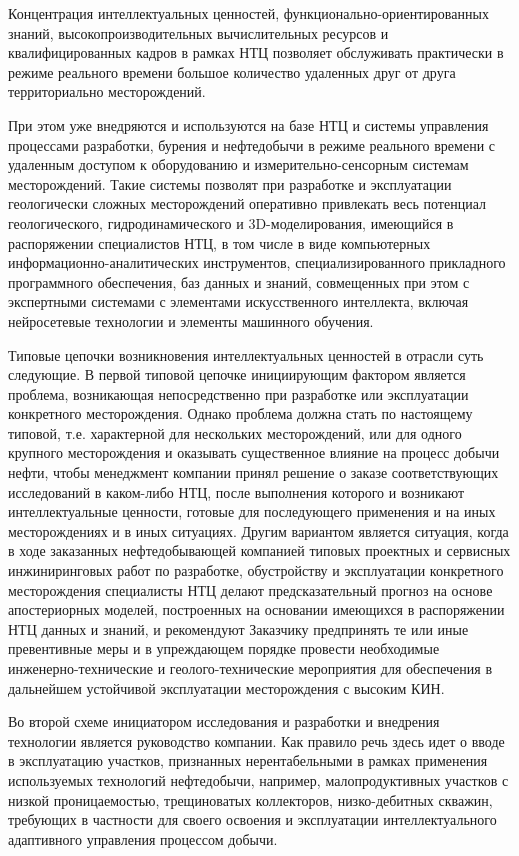 Концентрация интеллектуальных ценностей, функционально-ориентированных знаний, высокопроизводительных вычислительных ресурсов и квалифицированных кадров в рамках НТЦ позволяет обслуживать практически в режиме реального времени большое количество удаленных друг от друга территориально месторождений.

При этом уже внедряются и используются на базе НТЦ и системы управления процессами разработки, бурения и нефтедобычи в режиме реального времени с удаленным доступом к оборудованию и измерительно-сенсорным системам месторождений.
Такие системы позволят при разработке и эксплуатации геологически сложных месторождений оперативно привлекать весь потенциал геологического, гидродинамического и 3D-моделирования, имеющийся в распоряжении специалистов НТЦ, в том числе в виде компьютерных информационно-аналитических инструментов, специализированного прикладного программного обеспечения, баз данных и знаний, совмещенных при этом с экспертными системами с элементами искусственного интеллекта, включая нейросетевые технологии и элементы машинного обучения.

Типовые цепочки возникновения интеллектуальных ценностей в отрасли суть следующие.
В первой типовой цепочке инициирующим фактором является проблема, возникающая непосредственно при разработке или эксплуатации конкретного месторождения.
Однако проблема должна стать по настоящему типовой, т.е. характерной для нескольких месторождений, или для одного крупного месторождения и оказывать существенное влияние на процесс добычи нефти, чтобы менеджмент компании принял решение о заказе соответствующих исследований в каком-либо НТЦ, после выполнения которого и возникают интеллектуальные ценности, готовые для последующего применения и на иных месторождениях и в иных ситуациях.
Другим вариантом является ситуация, когда в ходе заказанных нефтедобывающей компанией типовых проектных и сервисных инжиниринговых работ по разработке, обустройству и эксплуатации конкретного месторождения специалисты НТЦ делают предсказательный прогноз на основе апостериорных моделей, построенных на основании имеющихся в распоряжении НТЦ данных и знаний, и рекомендуют Заказчику предпринять те или иные превентивные меры и в упреждающем порядке провести необходимые инженерно-технические и геолого-технические мероприятия для обеспечения в дальнейшем устойчивой эксплуатации месторождения с высоким КИН.

Во второй схеме инициатором исследования и разработки и внедрения технологии является руководство компании.
Как правило речь здесь идет о вводе в эксплуатацию участков, признанных нерентабельными в рамках применения используемых технологий нефтедобычи, например, малопродуктивных участков с низкой проницаемостью, трещиноватых коллекторов, низко-дебитных скважин, требующих в частности для своего освоения и эксплуатации интеллектуального адаптивного управления процессом добычи.

